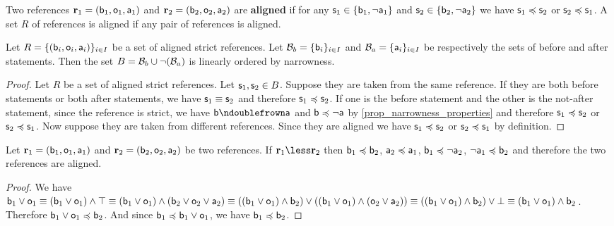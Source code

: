 \documentclass[11pt,letterpaper,fleqn]{memoir} %
\begin{document}
\begin{mathSection}
\begin{defn}
	Two references $\refStmt_1 = (\stmt[b]_1, \stmt[o]_1, \stmt[a]_1)$ and $\refStmt_2 = (\stmt[b]_2, \stmt[o]_2, \stmt[a]_2)$ are \textbf{aligned} if for any $\stmt_1 \in \{ \stmt[b]_1, \NOT\stmt[a]_1\}$ and $\stmt_2 \in \{ \stmt[b]_2, \NOT\stmt[a]_2\}$ we have 
	$\stmt_1 \narrower \stmt_2$ or $\stmt_2 \narrower \stmt_1$. A set $R$ of references is aligned if any pair of references is aligned.
\end{defn}
\begin{prop}\label{3_prop_strict_alignment_is_ordering}
	Let $R = \{(\stmt[b]_i, \stmt[o]_i, \stmt[a]_i)\}_{i\in I}$ be a set of aligned strict references. Let $\basis_b = \{\stmt[b]_i\}_{i\in I}$ and $\basis_a = \{\stmt[a]_i\}_{i\in I}$ be respectively the sets of before and after statements. Then the set $B = \basis_b \cup \NOT (\basis_a)$ is linearly ordered by narrowness.
\end{prop}
\begin{proof}
	Let $R$ be a set of aligned strict references. Let $\stmt_1, \stmt_2 \in B$. Suppose they are taken from the same reference. If they are both before statements or both after statements, we have $\stmt_1 \equiv \stmt_2$ and therefore $\stmt_1 \narrower \stmt_2$. If one is the before statement and the other is the not-after statement, since the reference is strict, we have $\stmt[b] \ncomp \stmt[a]$ and $\stmt[b] \narrower \NOT\stmt[a]$ by \ref{prop_narrowness_properties} and therefore $\stmt_1 \narrower \stmt_2$ or $\stmt_2 \narrower \stmt_1$. Now suppose they are taken from different references. Since they are aligned we have  $\stmt_1 \narrower \stmt_2$ or $\stmt_2 \narrower \stmt_1$ by definition.
\end{proof}

\begin{prop}\label{3_prop_ordered_references_are_aligned}
	Let $\refStmt_1 = ( \stmt[b]_1, \stmt[o]_1, \stmt[a]_1 )$ and $\refStmt_2 = ( \stmt[b]_2, \stmt[o]_2, \stmt[a]_2 )$ be two references. If $\refStmt_1 \less \refStmt_2$ then $\stmt[b]_1 \narrower \stmt[b]_2$, $\stmt[a]_2 \narrower \stmt[a]_1$, $\stmt[b]_1 \narrower \NOT \stmt[a]_2$, $\NOT \stmt[a]_1 \narrower \stmt[b]_2$ and therefore the two references are aligned.
\end{prop}
\begin{proof}
	We have $\stmt[b]_1 \OR \stmt[o]_1 \equiv (\stmt[b]_1 \OR \stmt[o]_1) \AND \certainty \equiv (\stmt[b]_1 \OR \stmt[o]_1) \AND (\stmt[b]_2 \OR \stmt[o]_2 \OR \stmt[a]_2) \equiv ((\stmt[b]_1 \OR \stmt[o]_1) \AND \stmt[b]_2) \OR ((\stmt[b]_1 \OR \stmt[o]_1) \AND (\stmt[o]_2 \OR \stmt[a]_2)) \equiv ((\stmt[b]_1 \OR \stmt[o]_1) \AND \stmt[b]_2) \OR \impossibility \equiv (\stmt[b]_1 \OR \stmt[o]_1) \AND \stmt[b]_2$. Therefore $\stmt[b]_1 \OR \stmt[o]_1 \narrower \stmt[b]_2$. And since $\stmt[b]_1 \narrower \stmt[b]_1 \OR \stmt[o]_1$, we have $\stmt[b]_1 \narrower \stmt[b]_2$.
	

\end{proof}
\end{mathSection}
\end{document}

